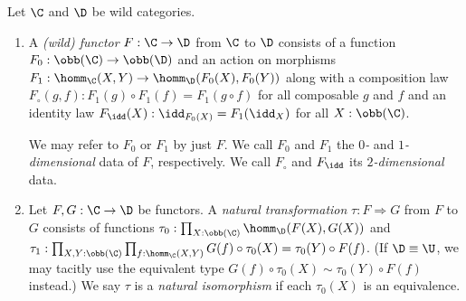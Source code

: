 \documentclass{lmcs}
\theoremstyle{definition}\newtheorem{note}[thm]{Note}
\begin{document}
\begin{defi}
Let $\C$ and $\D$ be wild categories.

\begin{enumerate}
\item A \emph{(wild) functor} $F : \C \to \D$ from $\C$ to $\D$ consists of a function $F_0 : \obb(\C) \to \obb(\D)$ and an action on morphisms $F_1  : \homm_{\C}(X,Y) \to \homm_{\D}(F_0(X), F_0(Y))$  along with a composition law $F_{\circ}(g,f)  : F_1(g) \circ F_1(f) = F_1(g \circ f) $ for all composable $g$ and $f$ and an identity law $F_{\idd}(X)   : \idd_{F_0(X)} = F_1(\idd_X)$ for all $X : \obb(\C)$.

We may refer to $F_0$ or $F_1$ by just $F$. We call $F_0$ and $F_1$ the \emph{$0$-} and \emph{$1$-dimensional} data of $F$, respectively. We call $F_{\circ}$ and $F_{\idd}$ its \emph{$2$-dimensional} data.

\item Let $F, G : \C \to \D$ be functors. A \emph{natural transformation} $\tau : F \Rightarrow G$ from $F$ to $G$ consists of functions 
$\tau_0 :\prod_{X : \obb(\C)}\homm_{\D}(F(X), G(X))$ and $\tau_1  : \prod_{X, Y : \obb(\C)}\prod_{f : \homm_{\C}(X , Y)}G(f) \circ \tau_0(X) = \tau_0(Y) \circ F(f)$. (If $\D \equiv \U$, we may tacitly use the equivalent type $G(f) \circ \tau_0(X) \sim \tau_0(Y) \circ F(f)$ instead.)
We say $\tau$ is a \emph{natural isomorphism} if each $\tau_0(X)$ is an equivalence.  
\end{enumerate}
\end{defi}
\end{document}

